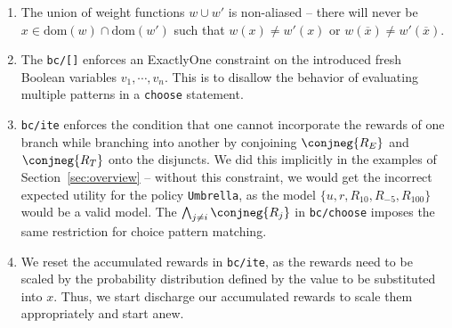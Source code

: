 \begin{enumerate}[leftmargin=*]
  \item The union of weight functions $w \cup w'$ is
  non-aliased -- there will never be
  $x \in \mathrm{dom}(w) \cap \mathrm{dom}(w')$ such that
  $w(x) \neq w'(x)$ or $w(\overline x) \neq w' (\overline x)$.
  \item The \texttt{bc/[]} enforces an ExactlyOne constraint
  on the introduced fresh Boolean variables $v_1,\cdots, v_n$.
  This is to disallow the behavior of evaluating multiple
  patterns in a \texttt{choose} statement.
  \item \texttt{bc/ite}
  enforces the condition that one cannot
  incorporate the rewards of one branch while branching into
  another by conjoining $\conjneg{R_E}$ and $\conjneg{R_T}$
  onto the disjuncts.
  We did this implicitly in the examples of
  Section~\ref{sec:overview} --
  without this constraint, we would get the incorrect
  expected utility for the policy \texttt{Umbrella},
  as the model $\{u, r, R_{10}, R_{-5}, R_{100}\}$
  would be a valid model.
  The $\bigwedge_{j \neq i} \conjneg{R_j}$ in \texttt{bc/choose}
  imposes the same restriction for choice pattern matching.
  \item We reset the accumulated rewards in \texttt{bc/ite}, as the rewards
  need to be scaled by the probability distribution defined by the value to be
  substituted into $x$. Thus, we start discharge our accumulated rewards to scale them
  appropriately and start anew.
\end{enumerate}

